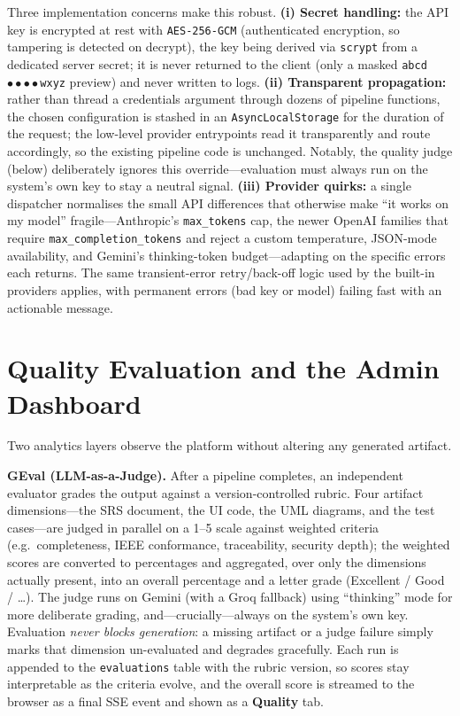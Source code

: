 \documentclass[12pt,a4paper,oneside]{report}
\begin{document}
Three implementation concerns make this robust. \textbf{(i) Secret handling:} the API key is encrypted at rest with \texttt{AES-256-GCM} (authenticated encryption, so tampering is detected on decrypt), the key being derived via \texttt{scrypt} from a dedicated server secret; it is never returned to the client (only a masked \texttt{abcd}\(\bullet\bullet\bullet\bullet\)\texttt{wxyz} preview) and never written to logs. \textbf{(ii) Transparent propagation:} rather than thread a credentials argument through dozens of pipeline functions, the chosen configuration is stashed in an \texttt{AsyncLocalStorage} for the duration of the request; the low-level provider entrypoints read it transparently and route accordingly, so the existing pipeline code is unchanged. Notably, the quality judge (below) deliberately ignores this override---evaluation must always run on the system's own key to stay a neutral signal. \textbf{(iii) Provider quirks:} a single dispatcher normalises the small API differences that otherwise make ``it works on my model'' fragile---Anthropic's \texttt{max\_tokens} cap, the newer OpenAI families that require \texttt{max\_completion\_tokens} and reject a custom temperature, JSON-mode availability, and Gemini's thinking-token budget---adapting on the specific errors each returns. The same transient-error retry/back-off logic used by the built-in providers applies, with permanent errors (bad key or model) failing fast with an actionable message.

\section{Quality Evaluation and the Admin Dashboard}
Two analytics layers observe the platform without altering any generated artifact.

\textbf{GEval (LLM-as-a-Judge).} After a pipeline completes, an independent evaluator grades the output against a version-controlled rubric. Four artifact dimensions---the SRS document, the UI code, the UML diagrams, and the test cases---are judged in parallel on a 1--5 scale against weighted criteria (e.g.\ completeness, IEEE conformance, traceability, security depth); the weighted scores are converted to percentages and aggregated, over only the dimensions actually present, into an overall percentage and a letter grade (Excellent / Good / \ldots). The judge runs on Gemini (with a Groq fallback) using ``thinking'' mode for more deliberate grading, and---crucially---always on the system's own key. Evaluation \emph{never blocks generation}: a missing artifact or a judge failure simply marks that dimension un-evaluated and degrades gracefully. Each run is appended to the \texttt{evaluations} table with the rubric version, so scores stay interpretable as the criteria evolve, and the overall score is streamed to the browser as a final SSE event and shown as a \textbf{Quality} tab.
\end{document}
